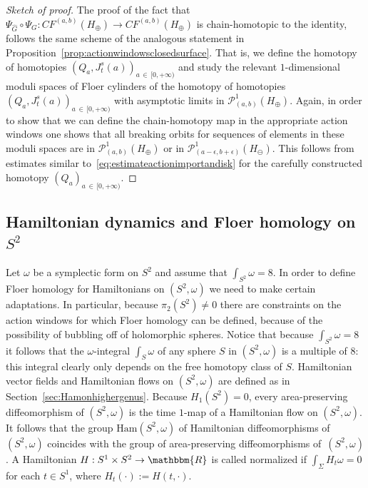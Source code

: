 \documentclass[AHL,Unicode,longabstracts,published]{cedram}
\newcommand{\R}{\mathbbm{R}}
\newcommand{\Ham}{\mathrm{Ham}}
\newcommand{\clP}{\mathcal{P}}
\begin{document}
\begin{proof}[Sketch of proof]
The proof of the fact that $\Psi_{\widehat{G}} \circ \Psi_{{G}} : CF^{(a,b)}(H_\oplus) \to CF^{(a,b)}(H_\oplus) $ is chain-homotopic to the identity, follows the same scheme of the analogous statement in Proposition~\ref{prop:actionwindowsclosedsurface}. That is, we define the homotopy of homotopies $(Q_a,J^s_t(a))_{a\,\in\,[0,+\infty)}$ and study the relevant $1$-dimensional moduli spaces of Floer cylinders of the homotopy of homotopies $(Q_a,J^s_t(a))_{a\, \in\,[0,+\infty)}$ with asymptotic limits in $\clP^1_{(a,b)}(H_\oplus)$. Again, in order to show that we can define the chain-homotopy map in the appropriate action windows one shows that all breaking orbits for sequences of elements in these moduli spaces are in $\clP^1_{(a,b)}(H_\oplus)$ or in $\clP^1_{(a-\epsilon,b+\epsilon)}(H_\ominus)$. This follows from estimates similar to~\eqref{eq:estimateactionimportandisk} for the carefully constructed homotopy $(Q_a)_{a\,\in\,[0,+\infty)}$.
\end{proof}



\subsection{Hamiltonian dynamics and Floer homology on \texorpdfstring{$S^2$}{S2}} \label{sec:Hamonsphere}

Let $\omega$ be a symplectic form on $S^2$ and assume that $\int_{S^2} \omega = 8$. In order to define Floer homology for Hamiltonians on $(S^2,\omega)$ we need to make certain adaptations. In particular, because $\pi_2(S^2) \neq 0$ there are constraints on the action windows for which Floer homology can be defined, because of the possibility of bubbling off of holomorphic spheres. Notice that because $\int_{S^2} \omega = 8$ it follows that the $\omega$-integral $\int_S \omega$ of any sphere $S$ in $(S^2,\omega)$ is a multiple of $8$: this integral clearly only depends on the free homotopy class of $S$. Hamiltonian vector fields and Hamiltonian flows on $(S^2,\omega)$ are defined as in Section~\ref{sec:Hamonhighergenus}. Because $H_1(S^2) = 0$, every area-preserving diffeomorphism of $(S^2,\omega)$ is the time $1$-map of a Hamiltonian flow on $(S^2,\omega)$. It follows that the group $\Ham(S^2,\omega)$ of Hamiltonian diffeomorphisms of $(S^2,\omega)$ coincides with the group of area-preserving diffeomorphisms of~$(S^2,\omega)$. A Hamiltonian $H: S^1 \times S^2 \to \R$ is called normalized if $\int_\Sigma H_t\omega=0$ for each $t\in S^1$, where $H_t(\cdot):= H(t,\cdot)$.
\end{document}
